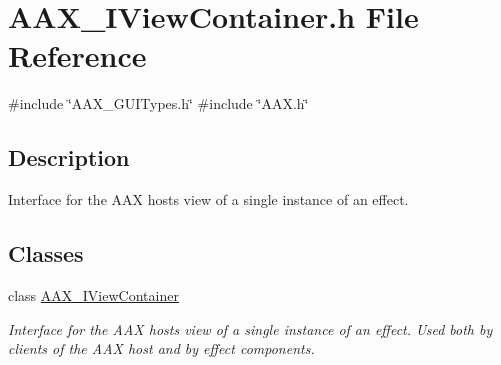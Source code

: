 \hypertarget{a00644}{}\section{A\+A\+X\+\_\+\+I\+View\+Container.\+h File Reference}
\label{a00644}
{\ttfamily \#include \char`\"{}A\+A\+X\+\_\+\+G\+U\+I\+Types.\+h\char`\"{}}\newline
{\ttfamily \#include \char`\"{}A\+A\+X.\+h\char`\"{}}\newline


\subsection{Description}
Interface for the A\+AX host\textquotesingle{}s view of a single instance of an effect. 

\subsection*{Classes}
\begin{DoxyCompactItemize}
\item 
class \mbox{\hyperlink{a01889}{A\+A\+X\+\_\+\+I\+View\+Container}}
\begin{DoxyCompactList}\small\item\em Interface for the A\+AX host\textquotesingle{}s view of a single instance of an effect. Used both by clients of the A\+AX host and by effect components. \end{DoxyCompactList}\end{DoxyCompactItemize}
